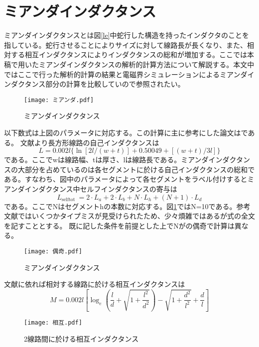 \section{ミアンダインダクタンス}
ミアンダインダクタンスとは図\ref{le}中蛇行した構造を持ったインダクタのことを指している。蛇行させることによりサイズに対して線路長が長くなり、また、相対する相互インダクタンスによりインダクタンスの総和が増加する。ここでは本稿で用いたミアンダインダクタンスの解析的計算方法について解説する。本文中ではここで行った解析的計算の結果と電磁界シミュレーションによるミアンダインダクタンス部分の計算を比較していので参照されたい。
\begin{figure}[H]
    \label{ミアンダ}
    \centering
    \texttt{[image: ミアンダ.pdf]}
    \caption{ミアンダインダクタンス}
\end{figure}
以下数式は上図のパラメータに対応する。この計算に主に参考にした論文は\cite*{Stojanovic2004}である。
文献\cite*{Grover}より長方形線路の自己インダクタンスは
\begin{equation}
    L=0.002 l\{\ln [2 l /(w+t)]+0.50049+[(w+t) / 3 l]\}
\end{equation}
である。ここでwは線路幅、tは厚さ、lは線路長である。ミアンダインダクタンスの大部分を占めているのは各セグメントに於ける自己インダクタンスの総和である。すなわち、図中のパラメータによって各セグメントをラベル付けするとミアンダインダクタンス中セルフインダクタンスの寄与は
\begin{equation}
    L_{\text {selftot }}=2 \cdot L_{a}+2 \cdot L_{b}+N \cdot L_{h}+(N+1) \cdot L_{d}
\end{equation}
である。ここでNはセグメントhの本数に対応する。図\ref*{ミアンダ}ではN=10である。参考文献ではいくつかタイプミスが見受けられたため、少々煩雑ではあるが式の全文を記すこととする。
既に記した条件を前提とした上でNがの偶奇で計算は異なる。
\begin{figure}[H]
    \label{偶奇}
    \centering
    \texttt{[image: 偶奇.pdf]}
    \caption{ミアンダインダクタンス}
\end{figure}
文献\cite*{Grover}に依れば相対する線路に於ける相互インダクタンスは
\begin{equation}
    M=0.002 l\left[\log _{e}\left(\frac{l}{d}+\sqrt{1+\frac{l^{2}}{d^{2}}}\right)-\sqrt{1+\frac{d^{2}}{l^{2}}}+\frac{d}{l}\right]
\end{equation}
\begin{figure}[H]
    \label{相互}
    \centering
    \texttt{[image: 相互.pdf]}
    \caption{2線路間に於ける相互インダクタンス}
\end{figure}
